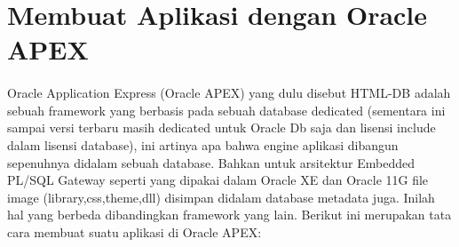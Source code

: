 \section{Membuat Aplikasi dengan Oracle APEX}
\paragraph{}Oracle Application Express (Oracle APEX) yang dulu disebut HTML-DB adalah sebuah framework yang berbasis pada sebuah database dedicated (sementara ini sampai versi terbaru masih dedicated untuk Oracle Db saja dan lisensi include dalam lisensi database), ini artinya apa bahwa engine aplikasi dibangun sepenuhnya didalam sebuah database. Bahkan untuk arsitektur Embedded PL/SQL Gateway seperti yang dipakai dalam Oracle XE dan Oracle 11G file image (library,css,theme,dll) disimpan didalam database metadata juga. Inilah hal yang berbeda dibandingkan framework yang lain. Berikut ini merupakan tata cara membuat suatu aplikasi di Oracle APEX:

